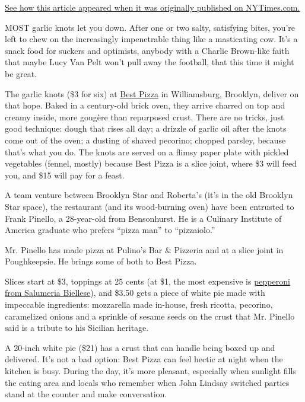 \href{https://archive.nytimes3xbfgragh.onion/www.nytimes3xbfgragh.onion/2011/03/09/dining/reviews/09under.html}{See
how this article appeared when it was originally published on
NYTimes.com.}

MOST garlic knots let you down. After one or two salty, satisfying
bites, you're left to chew on the increasingly impenetrable thing like a
masticating cow. It's a snack food for suckers and optimists, anybody
with a Charlie Brown-like faith that maybe Lucy Van Pelt won't pull away
the football, that this time it might be great.

The garlic knots (\$3 for six) at \href{http://best.piz.za.com/}{Best
Pizza} in Williamsburg, Brooklyn, deliver on that hope. Baked in a
century-old brick oven, they arrive charred on top and creamy inside,
more gougère than repurposed crust. There are no tricks, just good
technique: dough that rises all day; a drizzle of garlic oil after the
knots come out of the oven; a dusting of shaved pecorino; chopped
parsley, because that's what you do. The knots are served on a flimsy
paper plate with pickled vegetables (fennel, mostly) because Best Pizza
is a slice joint, where \$3 will feed you, and \$15 will pay for a
feast.

A team venture between Brooklyn Star and Roberta's (it's in the old
Brooklyn Star space), the restaurant (and its wood-burning oven) have
been entrusted to Frank Pinello, a 28-year-old from Bensonhurst. He is a
Culinary Institute of America graduate who prefers ``pizza man'' to
``pizzaiolo.''

Mr. Pinello has made pizza at Pulino's Bar \& Pizzeria and at a slice
joint in Poughkeepsie. He brings some of both to Best Pizza.

Slices start at \$3, toppings at 25 cents (at \$1, the most expensive is
\href{http://www.salumeriabiellese.com/}{pepperoni from Salumeria
Biellese}), and \$3.50 gets a piece of white pie made with impeccable
ingredients: mozzarella made in-house, fresh ricotta, pecorino,
caramelized onions and a sprinkle of sesame seeds on the crust that Mr.
Pinello said is a tribute to his Sicilian heritage.

A 20-inch white pie (\$21) has a crust that can handle being boxed up
and delivered. It's not a bad option: Best Pizza can feel hectic at
night when the kitchen is busy. During the day, it's more pleasant,
especially when sunlight fills the eating area and locals who remember
when John Lindsay switched parties stand at the counter and make
conversation.

